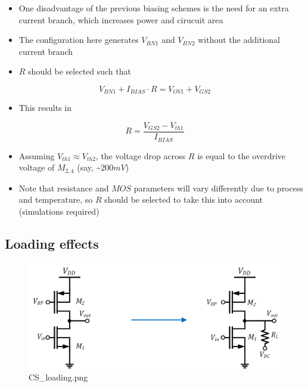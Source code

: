 \documentclass[11pt]{article}
\providecommand{\tightlist}{%
      \setlength{\itemsep}{0pt}\setlength{\parskip}{0pt}}
\begin{document}
    \begin{itemize}
\item
  One disadvantage of the previous biasing schemes is the need for an
  extra current branch, which increases power and cirucuit area
\item
  The configuration here generates \(V_{BN1}\) and \(V_{BN2}\) without
  the additional current branch
\item
  \(R\) should be selected such that
\end{itemize}

\begin{equation}
V_{BN1} + I_{BIAS}\cdot R = V_{OV1} + V_{GS2}
\end{equation}

\begin{itemize}
\tightlist
\item
  This results in
\end{itemize}

\begin{equation}
R = \dfrac{V_{GS2} - V_{th1}}{I_{BIAS}}
\end{equation}

\begin{itemize}
\item
  Assuming \(V_{th1} \approx V_{th2}\), the voltage drop across \(R\) is
  equal to the overdrive voltage of \(M_{2,4}\) (say,
  \textasciitilde{}\(200mV\))
\item
  Note that resistance and \(MOS\) parameters will vary differently due
  to process and temperature, so \(R\) should be selected to take this
  into account (simulations required)
\end{itemize}

    \hypertarget{loading-effects}{%
\subsection{Loading effects}\label{loading-effects}}

    \begin{figure}
\centering
\includegraphics{CS_loading.png}
\caption{CS\_loading.png}
\end{figure}
\end{document}
